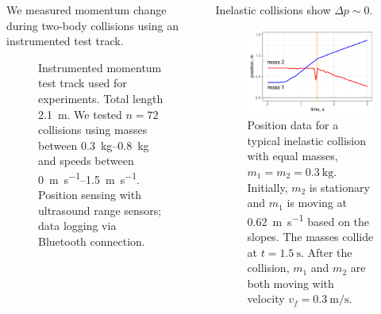 \documentclass[pdf,serif]{beamer}
\begin{document}
\begin{frame}{}
\begin{columns}[T,totalwidth=\textwidth]
\begin{column}{14.33in}
\begin{minipage}[t][\textheight]{\linewidth}
\begin{block}{We measured momentum change during two-body collisions using an instrumented test track.}
\begin{figure}[h]
\begin{center}
\end{center}
\caption{Instrumented momentum test track used for experiments. Total length \SI{2.1}{\meter}. We tested $n=72$ collisions using masses between \SIrange{0.3}{0.8}{\kilo\gram} and speeds between \SIrange{0}{1.5}{\meter\per\second}. Position sensing with ultrasound range sensors; data logging via Bluetooth connection.}
\label{fig:methods1}
\end{figure}
\end{block}
\vfill
\end{minipage}
\end{column}

\begin{column}{14.33in}
\begin{minipage}[t][\textheight]{\linewidth}
\begin{block}{Inelastic collisions show $\Delta p\sim 0$.}
\begin{figure}
\begin{center}
\includegraphics[width=0.8\columnwidth]{inelastic.pdf}
\end{center}
\caption{Position data for a typical inelastic collision with equal masses, $m_1=m_2=\SI{0.3}{\kilo\gram}$. Initially, $m_2$ is stationary and $m_1$ is moving at \SI{0.62}{\meter\per\second} based on the slopes. The masses collide at $t=\SI{1.5}{\second}$. After the collision, $m_1$ and $m_2$ are both moving with velocity $v_f=\SI{0.3}{\meter\per\second}$. }
\label{fig:results1}
\end{figure}
\begin{figure}
\begin{center}

\end{center}
\end{figure}
\end{block}
\end{minipage}
\end{column}
\end{columns}
\end{frame}
\end{document}
